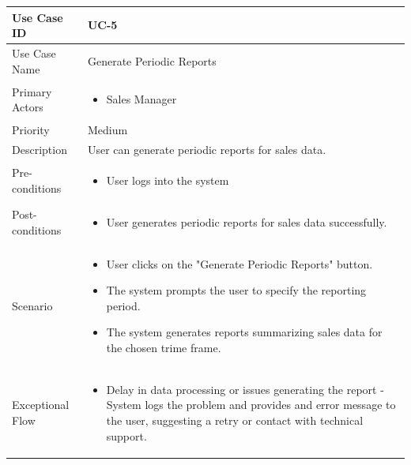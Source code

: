 \begin{tabularx}{\textwidth}{|l|X|}
\hline
Use Case ID & UC-5 \\
\hline
Use Case Name & Generate Periodic Reports\\
\hline
Primary Actors & 
\begin{itemize}
    \item Sales Manager
\end{itemize} \\
\hline
Priority & Medium \\
\hline
Description & User can generate periodic reports for sales data. \\
\hline
Pre-conditions & 
\begin{itemize}    
    \item User logs into the system
\end{itemize} \\
\hline
Post-conditions & 
\begin{itemize}
    \item User generates periodic reports for sales data successfully.
\end{itemize} \\
\hline
Scenario & 
\begin{itemize}
    \item User clicks on the "Generate Periodic Reports" button. 
    \item The system prompts the user to specify the reporting period.
    \item The system generates reports summarizing sales data for the chosen trime frame.
\end{itemize}\\
\hline
Exceptional Flow & 
\begin{itemize}
    \item Delay in data processing or issues generating the report - System logs the problem and provides and error message to the user, suggesting a retry or contact with technical support.
\end{itemize}\\
\hline
\end{tabularx}

\vspace{12pt}

